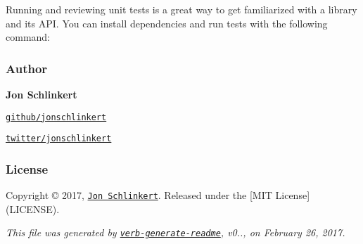 Running and reviewing unit tests is a great way to get familiarized with a library and its A\+PI. You can install dependencies and run tests with the following command\+:




\subsubsection*{Author}

{\bfseries Jon Schlinkert}


\begin{DoxyItemize}
\item \href{https://github.com/jonschlinkert}{\tt github/jonschlinkert}
\item \href{https://twitter.com/jonschlinkert}{\tt twitter/jonschlinkert}
\end{DoxyItemize}

\subsubsection*{License}

Copyright © 2017, \href{https://github.com/jonschlinkert}{\tt Jon Schlinkert}. Released under the \mbox{[}M\+IT License\mbox{]}(L\+I\+C\+E\+N\+SE).





{\itshape This file was generated by \href{https://github.com/verbose/verb-generate-readme}{\tt verb-\/generate-\/readme}, v0.., on February 26, 2017.} 